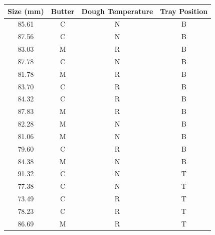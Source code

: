 \documentclass[paper=a4, fontsize=11pt]{scrartcl} %
\numberwithin{equation}{section} %
\numberwithin{figure}{section} %
\numberwithin{table}{section} %
\begin{document}
\begin{table}[H]
	\centering
	\begin{tabular}{|c|c|c|c|}
		\hline
		\textbf{Size (mm)} & \textbf{Butter} & \textbf{Dough Temperature} & \textbf{Tray Position} \\ \hline
		85.61              & C               & N                          & B                      \\ \hline
		87.56              & C               & N                          & B                      \\ \hline
		83.03              & M               & R                          & B                      \\ \hline
		87.78              & C               & N                          & B                      \\ \hline
		81.78              & M               & R                          & B                      \\ \hline
		83.70              & C               & R                          & B                      \\ \hline
		84.32              & C               & R                          & B                      \\ \hline
		87.83              & M               & R                          & B                      \\ \hline
		82.28              & M               & N                          & B                      \\ \hline
		81.06              & M               & N                          & B                      \\ \hline
		79.60              & C               & R                          & B                      \\ \hline
		84.38              & M               & N                          & B                      \\ \hline
		91.32              & C               & N                          & T                      \\ \hline
		77.38              & C               & N                          & T                      \\ \hline
		73.49              & C               & R                          & T                      \\ \hline
		78.23              & C               & R                          & T                      \\ \hline
		86.69              & M               & R                          & T                      \\ \hline

\end{tabular}
\end{table}
\end{document}
